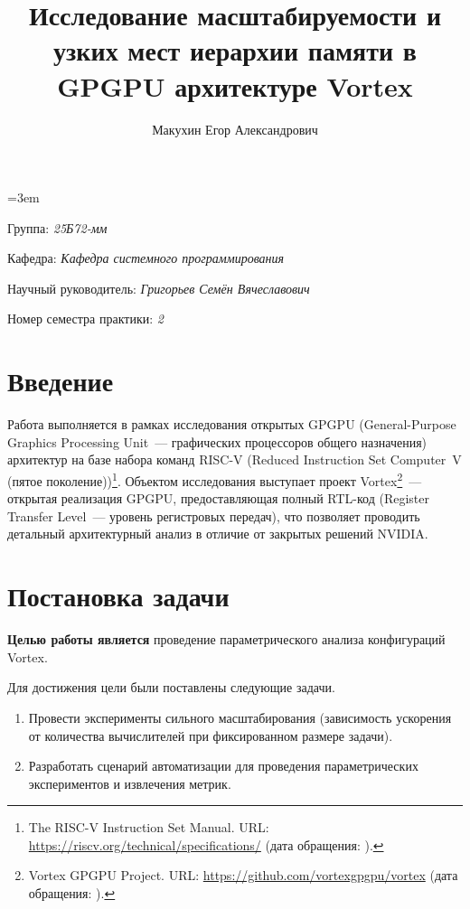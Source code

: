 \documentclass[a4paper]{article}
\title{Исследование масштабируемости и узких мест иерархии памяти в GPGPU архитектуре Vortex}
\author{Макухин Егор Александрович}
\date{}
\begin{document}
\raggedbottom
\emergencystretch=3em

\maketitle

\begin{flushright}
    Группа: \emph{25Б72-мм}

    Кафедра: \emph{Кафедра системного программирования}

    Научный руководитель: \emph{Григорьев Семён Вячеславович}
    
    Номер семестра практики: \emph{2}
\end{flushright} 

\section{Введение}

Работа выполняется в рамках исследования открытых GPGPU (General-Purpose Graphics Processing Unit~--- графических процессоров общего назначения) архитектур на базе набора команд RISC-V (Reduced Instruction Set Computer~V (пятое поколение))\footnote{The RISC-V Instruction Set Manual. URL: \url{https://riscv.org/technical/specifications/} (дата обращения: ).}. Объектом исследования выступает проект Vortex\footnote{Vortex GPGPU Project. URL: \url{https://github.com/vortexgpgpu/vortex} (дата обращения: ).}~--- открытая реализация GPGPU, предоставляющая полный RTL-код (Register Transfer Level~--- уровень регистровых передач), что позволяет проводить детальный архитектурный анализ в отличие от закрытых решений NVIDIA.

 \section{Постановка задачи}

\textbf{Целью работы является} проведение параметрического анализа конфигураций Vortex.

Для достижения цели были поставлены следующие задачи.
\begin{enumerate}
    \item Провести эксперименты сильного масштабирования (зависимость ускорения от количества вычислителей при фиксированном размере задачи).
    \item Разработать сценарий автоматизации для проведения параметрических экспериментов и извлечения метрик.
\end{enumerate}
\end{document}
